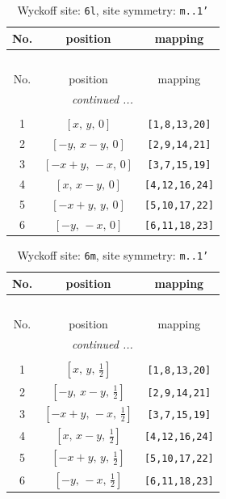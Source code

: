 \documentclass[fleqn,8pt]{jsarticle}
\begin{document}
\begin{longtable}{ccc}
\caption{Wyckoff site: {\tt 6l}, site symmetry: {\tt m..1'}}
 \\
 \hline \hline
No. & position & mapping \\ \hline \endfirsthead

\multicolumn{2}{l}{\tablename\ \thetable{}} \\
 \hline \hline
No. & position & mapping \\ \hline \endhead

 \hline \hline
\multicolumn{2}{r}{\footnotesize\it continued ...} \\ \endfoot

 \hline \hline
\multicolumn{2}{r}{} \\ \endlastfoot

1 & $\left[ x,\, y,\, 0 \right]$ & {\tt [1,8,13,20]} \\ \hline
2 & $\left[ - y,\, x - y,\, 0 \right]$ & {\tt [2,9,14,21]} \\ \hline
3 & $\left[ - x + y,\, - x,\, 0 \right]$ & {\tt [3,7,15,19]} \\ \hline
4 & $\left[ x,\, x - y,\, 0 \right]$ & {\tt [4,12,16,24]} \\ \hline
5 & $\left[ - x + y,\, y,\, 0 \right]$ & {\tt [5,10,17,22]} \\ \hline
6 & $\left[ - y,\, - x,\, 0 \right]$ & {\tt [6,11,18,23]} \\
\end{longtable}
\renewcommand{\arraystretch}{1.2}
\begin{longtable}{ccc}
\caption{Wyckoff site: {\tt 6m}, site symmetry: {\tt m..1'}}
 \\
 \hline \hline
No. & position & mapping \\ \hline \endfirsthead

\multicolumn{2}{l}{\tablename\ \thetable{}} \\
 \hline \hline
No. & position & mapping \\ \hline \endhead

 \hline \hline
\multicolumn{2}{r}{\footnotesize\it continued ...} \\ \endfoot

 \hline \hline
\multicolumn{2}{r}{} \\ \endlastfoot

1 & $\left[ x,\, y,\, \frac{1}{2} \right]$ & {\tt [1,8,13,20]} \\ \hline
2 & $\left[ - y,\, x - y,\, \frac{1}{2} \right]$ & {\tt [2,9,14,21]} \\ \hline
3 & $\left[ - x + y,\, - x,\, \frac{1}{2} \right]$ & {\tt [3,7,15,19]} \\ \hline
4 & $\left[ x,\, x - y,\, \frac{1}{2} \right]$ & {\tt [4,12,16,24]} \\ \hline
5 & $\left[ - x + y,\, y,\, \frac{1}{2} \right]$ & {\tt [5,10,17,22]} \\ \hline
6 & $\left[ - y,\, - x,\, \frac{1}{2} \right]$ & {\tt [6,11,18,23]} \\
\end{longtable}
\end{document}
